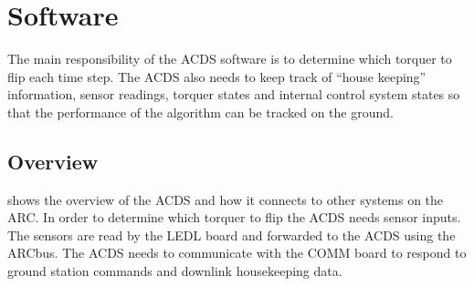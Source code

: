 
\chapter{Software}
\label{ch:Software}

The main responsibility of the \ac{ACDS} software is to determine which torquer to flip each time step. The \ac{ACDS} also needs to keep track of \enquote{house keeping} information, sensor readings, torquer states and internal control system states so that the performance of the algorithm can be tracked on the ground. 

\section{Overview}

 shows the overview of the \ac{ACDS} and how it connects to other systems on the \ac{ARC}. In order to determine which torquer to flip the \ac{ACDS} needs sensor inputs. The sensors are read by the \ac{LEDL} board and forwarded to the \ac{ACDS} using the \ac{ARC}bus. The \ac{ACDS} needs to communicate with the \ac{COMM} board to respond to ground station commands and downlink housekeeping data.

